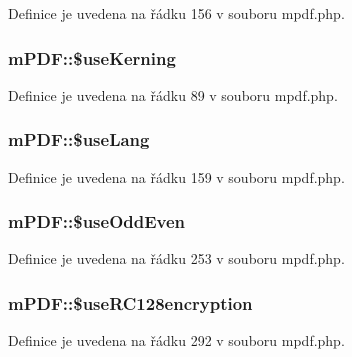 Definice je uvedena na řádku 156 v souboru mpdf.\-php.

\hypertarget{classm_p_d_f_a58d543901dd91e4ca74a77a894d799c4}{
\subsubsection[{\$use\-Kerning}]{\setlength{\rightskip}{0pt plus 5cm}m\-P\-D\-F\-::\$use\-Kerning}}\label{classm_p_d_f_a58d543901dd91e4ca74a77a894d799c4}


Definice je uvedena na řádku 89 v souboru mpdf.\-php.

\hypertarget{classm_p_d_f_a333dbef5325ee77fbf688f6087687f09}{
\subsubsection[{\$use\-Lang}]{\setlength{\rightskip}{0pt plus 5cm}m\-P\-D\-F\-::\$use\-Lang}}\label{classm_p_d_f_a333dbef5325ee77fbf688f6087687f09}


Definice je uvedena na řádku 159 v souboru mpdf.\-php.

\hypertarget{classm_p_d_f_ab13050dd399adb9df8822ce953856a51}{
\subsubsection[{\$use\-Odd\-Even}]{\setlength{\rightskip}{0pt plus 5cm}m\-P\-D\-F\-::\$use\-Odd\-Even}}\label{classm_p_d_f_ab13050dd399adb9df8822ce953856a51}


Definice je uvedena na řádku 253 v souboru mpdf.\-php.

\hypertarget{classm_p_d_f_ad42eda0e0347fb913105bc9509ee4b85}{
\subsubsection[{\$use\-R\-C128encryption}]{\setlength{\rightskip}{0pt plus 5cm}m\-P\-D\-F\-::\$use\-R\-C128encryption}}\label{classm_p_d_f_ad42eda0e0347fb913105bc9509ee4b85}


Definice je uvedena na řádku 292 v souboru mpdf.\-php.

